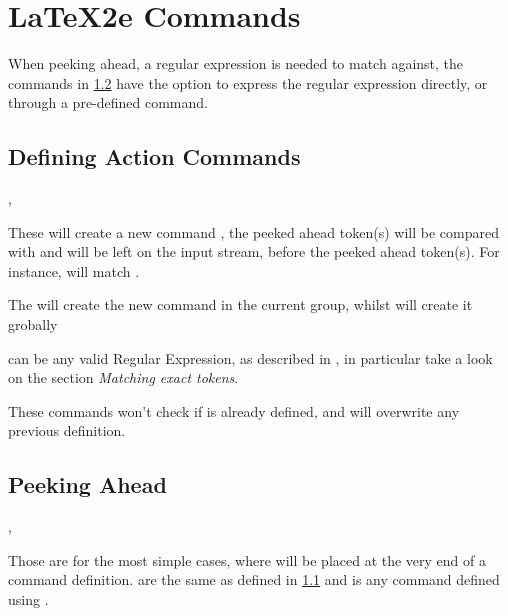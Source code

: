 \documentclass[10pt]{article}
\begin{document}
\section{LaTeX2e Commands}\label{2e-cmds}
When peeking ahead, a regular expression is needed to match against, the commands in \ref{peek-2e}  
have the option to express the regular expression directly,   or through a pre-defined command.


\subsection{Defining Action Commands}\label{cmd-def-2e}
\begin{codedescribe}{\xpeekSetCmd, \xpeekSetCmdGlobal}
\begin{codesyntax}%
\end{codesyntax}
These will create a new command , the peeked ahead token(s) will be compared with  and  will be left on the input stream, before the peeked ahead token(s). For instance,  will match \tsobj{\begin{envx}}.

The \tsobj{\xpeekSetCmd} will create the new command in the current group, whilst  \tsobj{\xpeekSetCmdGlobal} will create it grobally
\end{codedescribe}
\begin{tsremark}
   can be any valid Regular Expression, as described in \cite{expl3}, in particular take a look on the section \emph{Matching exact tokens}.
\end{tsremark}
\begin{tsremark}
  These commands won't check if  is already defined, and will overwrite any previous definition.
\end{tsremark}


\subsection{Peeking Ahead}\label{peek-2e}

\begin{codedescribe}{\xpeekTokCmd, \xpeekTok}
\begin{codesyntax}%
\end{codesyntax}
Those are for the most simple cases, where \tsobj[code,sep=or]{\xpeekTokCmd,\xpeekTok} will be placed at the very end of a command definition.  are the same as defined in \ref{cmd-def-2e} and  is any command defined using \tsobj[code,sep=or]{\xpeekSetCmd, \xpeekSetCmdGlobal}.
\end{codedescribe}
\end{document}
